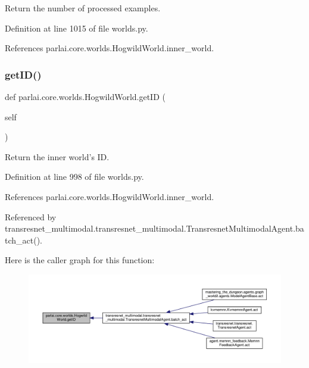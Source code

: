 \begin{DoxyVerb}Return the number of processed examples.\end{DoxyVerb}
 

Definition at line 1015 of file worlds.\+py.



References parlai.\+core.\+worlds.\+Hogwild\+World.\+inner\+\_\+world.

\mbox{\label{classparlai_1_1core_1_1worlds_1_1HogwildWorld_a67379773119cebd6ac70fce2abcb19a9}} 
\subsubsection{\texorpdfstring{get\+I\+D()}{getID()}}
{\footnotesize\ttfamily def parlai.\+core.\+worlds.\+Hogwild\+World.\+get\+ID (\begin{DoxyParamCaption}\item[{}]{self }\end{DoxyParamCaption})}

\begin{DoxyVerb}Return the inner world's ID.\end{DoxyVerb}
 

Definition at line 998 of file worlds.\+py.



References parlai.\+core.\+worlds.\+Hogwild\+World.\+inner\+\_\+world.



Referenced by transresnet\+\_\+multimodal.\+transresnet\+\_\+multimodal.\+Transresnet\+Multimodal\+Agent.\+batch\+\_\+act().

Here is the caller graph for this function\+:
\nopagebreak
\begin{figure}[H]
\begin{center}
\leavevmode
\includegraphics[width=350pt]{classparlai_1_1core_1_1worlds_1_1HogwildWorld_a67379773119cebd6ac70fce2abcb19a9_icgraph}
\end{center}
\end{figure}
\mbox{\label{classparlai_1_1core_1_1worlds_1_1HogwildWorld_ae0b4dc3d2bb4d1dbda7970da03da1a6e}} 
